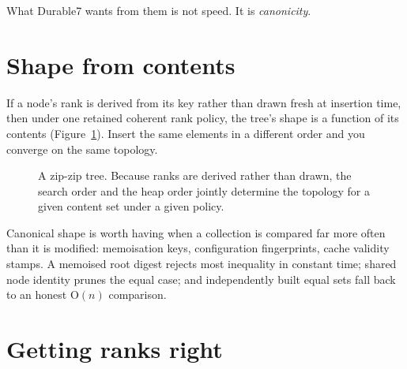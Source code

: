\documentclass[11pt,twoside,openright]{book}
\newcommand{\bigoh}[1]{$\mathrm{O}(#1)$}
\begin{document}
What Durable7 wants from them is not speed. It is \emph{canonicity}.

\section{Shape from contents}

If a node's rank is derived from its key rather than drawn fresh at insertion
time, then under one retained coherent rank policy, the tree's shape is a
function of its contents (Figure~\ref{fig:zip}). Insert the same elements in a
different order and you converge on the same topology.

\begin{figure}[htbp]
\centering
{}
\caption{A zip-zip tree. Because ranks are derived rather than drawn, the search
order and the heap order jointly determine the topology for a given content set
under a given policy.}
\label{fig:zip}
\end{figure}

Canonical shape is worth having when a collection is compared far more often
than it is modified: memoisation keys, configuration fingerprints, cache
validity stamps. A memoised root digest rejects most inequality in constant
time; shared node identity prunes the equal case; and independently built equal
sets fall back to an honest \bigoh{n} comparison.

\section{Getting ranks right}
\end{document}
